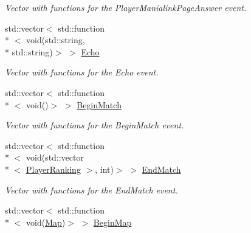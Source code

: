 \begin{DoxyCompactItemize}
\begin{DoxyCompactList}\small\item\em Vector with functions for the Player\-Manialink\-Page\-Answer event. \end{DoxyCompactList}\item 
\hypertarget{classPlugin_a427a43a87266e448d5543219a9fd26a2}{std\-::vector$<$ std\-::function\\*
$<$ void(std\-::string, \\*
std\-::string)$>$ $>$ \hyperlink{classPlugin_a427a43a87266e448d5543219a9fd26a2}{Echo}}\label{classPlugin_a427a43a87266e448d5543219a9fd26a2}

\begin{DoxyCompactList}\small\item\em Vector with functions for the Echo event. \end{DoxyCompactList}\item 
\hypertarget{classPlugin_a83f8709eb14504c24e44792438fea9f8}{std\-::vector$<$ std\-::function\\*
$<$ void()$>$ $>$ \hyperlink{classPlugin_a83f8709eb14504c24e44792438fea9f8}{Begin\-Match}}\label{classPlugin_a83f8709eb14504c24e44792438fea9f8}

\begin{DoxyCompactList}\small\item\em Vector with functions for the Begin\-Match event. \end{DoxyCompactList}\item 
\hypertarget{classPlugin_a772ce957615c12fd06fdf3190b5c85f5}{std\-::vector$<$ std\-::function\\*
$<$ void(std\-::vector\\*
$<$ \hyperlink{structPlayerRanking}{Player\-Ranking} $>$, int)$>$ $>$ \hyperlink{classPlugin_a772ce957615c12fd06fdf3190b5c85f5}{End\-Match}}\label{classPlugin_a772ce957615c12fd06fdf3190b5c85f5}

\begin{DoxyCompactList}\small\item\em Vector with functions for the End\-Match event. \end{DoxyCompactList}\item 
\hypertarget{classPlugin_a2ba64350d1fcc5269e2f61a0e3725e33}{std\-::vector$<$ std\-::function\\*
$<$ void(\hyperlink{structMap}{Map})$>$ $>$ \hyperlink{classPlugin_a2ba64350d1fcc5269e2f61a0e3725e33}{Begin\-Map}}\label{classPlugin_a2ba64350d1fcc5269e2f61a0e3725e33}


\end{DoxyCompactItemize}

